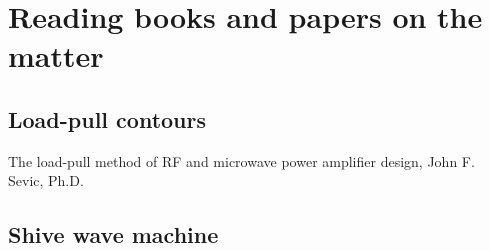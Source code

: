 \documentclass{article}
\begin{document}




\section{Reading books and papers on the matter}


\subsection{Load-pull contours}

The load-pull method of RF and microwave power amplifier design, John F. Sevic, Ph.D.


% 

%


\subsection{Shive wave machine}
\end{document}
